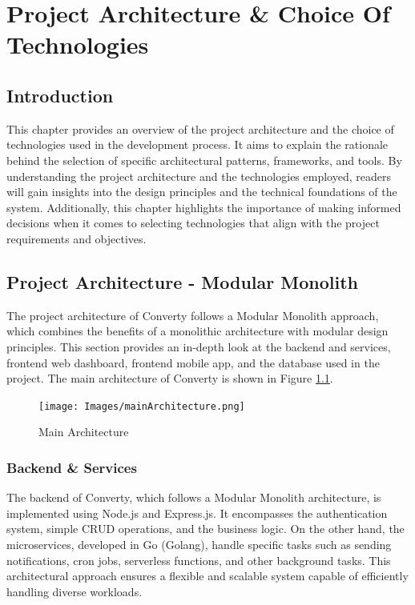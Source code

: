 \chapter{Project Architecture \& Choice Of Technologies}
\setcounter{minitocdepth}{1}
\minitoc
\newpage

\section{Introduction}
This chapter provides an overview of the project architecture and the choice of technologies used in the development process. It aims to explain the rationale behind the selection of specific architectural patterns, frameworks, and tools. By understanding the project architecture and the technologies employed, readers will gain insights into the design principles and the technical foundations of the system. Additionally, this chapter highlights the importance of making informed decisions when it comes to selecting technologies that align with the project requirements and objectives.

\section{Project Architecture - Modular Monolith}
The project architecture of Converty follows a Modular Monolith approach, which combines the benefits of a monolithic architecture with modular design principles. This section provides an in-depth look at the backend and services, frontend web dashboard, frontend mobile app, and the database used in the project.
The main architecture of Converty is shown in Figure \ref{fig:mainArchitecture}.

\begin{figure}[H]
    \centering
    \texttt{[image: Images/mainArchitecture.png]}
    \caption{Main Architecture}
    \label{fig:mainArchitecture}
\end{figure}

\subsection{Backend \& Services}
The backend of Converty, which follows a Modular Monolith architecture, is implemented using Node.js and Express.js. It encompasses the authentication system, simple CRUD operations, and the business logic. On the other hand, the microservices, developed in Go (Golang), handle specific tasks such as sending notifications, cron jobs, serverless functions, and other background tasks. This architectural approach ensures a flexible and scalable system capable of efficiently handling diverse workloads.

